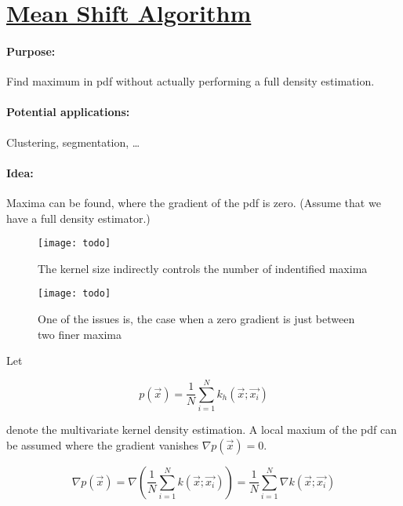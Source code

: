 
\section{\href{http://ieeexplore.ieee.org/document/1000236/?arnumber=1000236&tag=1}{Mean Shift Algorithm}}

\paragraph{Purpose:}
Find maximum in pdf without actually performing a full density estimation.

\paragraph{Potential applications:}
Clustering, segmentation, \ldots{}

\paragraph{Idea:} Maxima can be found, where the gradient of the pdf is zero. (Assume that we have a full density estimator.)

\begin{figure}[H]
  \centering
  \texttt{[image: todo]}
  \caption{The kernel size indirectly controls the number of indentified maxima}
\end{figure}
\begin{figure}[h]
  \label{mean-shift-issue}
  \centering
  \texttt{[image: todo]}
  \caption{One of the issues is, the case when a zero gradient is just between two finer maxima}
\end{figure}

Let

\begin{equation*}
  p(\vec{x}) = \dfrac{1}{N} \sum_{i=1}^N k_h(\vec{x}; \vec{x_i})
\end{equation*}

denote the multivariate kernel density estimation. A local maxium of the pdf can be assumed where the gradient vanishes $\nabla p(\vec{x}) = 0$.

\begin{equation*}
  \nabla p(\vec{x}) = \nabla (\dfrac{1}{N} \sum_{i=1}^N k(\vec{x}; \vec{x_i})) =  \dfrac{1}{N} \sum_{i=1}^N \nabla k(\vec{x}; \vec{x_i})
\end{equation*}

